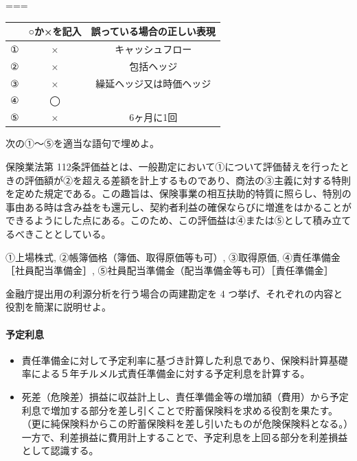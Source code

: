 \documentclass[report,gutter=10mm,fore-edge=10mm,uplatex,dvipdfmx]{jlreq}
\begin{document}
===


\begin{tabular}{|c|c|c|}
 \hline
 &○か×を記入&誤っている場合の正しい表現\\ \hline
 ①& × & キャッシュフロー\\ \hline
 ②& × &包括ヘッジ\\ \hline
 ③& × &繰延ヘッジ又は時価ヘッジ\\ \hline
 ④& ◯ &\\ \hline
 ⑤& × &6ヶ月に1回\\ \hline
\end{tabular}



次の①～⑤を適当な語句で埋めよ。

保険業法第 112条評価益とは、一般勘定において①について評価替えを行ったときの評価額が②を超える差額を計上するものであり、商法の③主義に対する特則を定めた規定である。この趣旨は、保険事業の相互扶助的特質に照らし、特別の事由ある時は含み益をも還元し、契約者利益の確保ならびに増進をはかることができるようにした点にある。このため、この評価益は④または⑤として積み立てるべきこととしている。


①上場株式, ②帳簿価格（簿価、取得原価等も可）, ③取得原価, ④責任準備金
［社員配当準備金］, ⑤社員配当準備金（配当準備金等も可）［責任準備金］


金融庁提出用の利源分析を行う場合の両建勘定を 4
つ挙げ、それぞれの内容と役割を簡潔に説明せよ。


\paragraph{予定利息}

\begin{itemize}
\item 責任準備金に対して予定利率に基づき計算した利息であり、保険料計算基礎率による５年チルメル式責任準備金に対する予定利息を計算する。
\item 死差（危険差）損益に収益計上し、責任準備金等の増加額（費用）から予定利息で増加する部分を差し引くことで貯蓄保険料を求める役割を果たす。（更に純保険料からこの貯蓄保険料を差し引いたものが危険保険料となる。）一方で、利差損益に費用計上することで、予定利息を上回る部分を利差損益として認識する。
\end{itemize}
\end{document}
